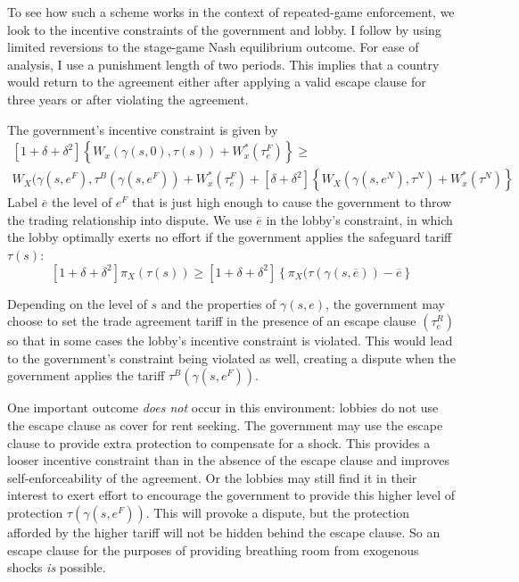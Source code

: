 \documentclass[12pt]{article}
\newcommand{\ov}{\overline}
\newcommand{\ga}{\gamma}
\newcommand{\de}{\delta}
\begin{document}
To see how such a scheme works in the context of repeated-game enforcement, we look to the incentive constraints of the government and lobby. I follow \Textcite{buzard2013a} by using limited reversions to the stage-game Nash equilibrium outcome. For ease of analysis, I use a punishment length of two periods. This implies that a country would return to the agreement either after applying a valid escape clause for three years or after violating the agreement.

The government's incentive constraint is given by
  \begin{multline}
    \left[1+ \de +\de^2 \right] \left\{W_x(\ga(s,0),\tau(s)) + W_x^*(\tau_e^F) \right\} \geq \\ W_X(\ga(s,e^F),\tau^B(\ga(s,e^F)) + W_x^*(\tau_e^F) + \left[\de +\de^2 \right] \left\{W_X(\ga(s,e^N),\tau^N) + W_x^*(\tau^N) \right\}
		\label{exp:govincentEC}
  \end{multline}
Label $\ov{e}$ the level of $e^F$ that is just high enough to cause the government to throw the trading relationship into dispute. We use $\ov{e}$ in the lobby's constraint, in which the lobby optimally exerts no effort if the government applies the safeguard tariff $\tau(s)$:
\begin{equation}
  \left[1+ \de +\de^2 \right] \pi_X(\tau(s)) \geq \left[1+ \de +\de^2 \right] \left\{\pi_X(\tau(\ga(s,\ov{e})) - \ov{e} \right\}
	\label{exp:lobbyEC}
\end{equation}

Depending on the level of $s$ and the properties of $\ga(s,e)$, the government may choose to set the trade agreement tariff in the presence of an escape clause $\left(\tau_e^R\right)$ so that in some cases the lobby's incentive constraint is violated. This would lead to the government's constraint being violated as well, creating a dispute when the government applies the tariff $\tau^B(\ga(s,e^F))$. 

One important outcome \textit{does not} occur in this environment: lobbies do not use the escape clause as cover for rent seeking. The government may use the escape clause to provide extra protection to compensate for a shock. This provides a looser incentive constraint than in the absence of the escape clause and improves self-enforceability of the agreement. Or the lobbies may still find it in their interest to exert effort to encourage the government to provide this higher level of protection $\tau(\ga(s,e^F))$. This will provoke a dispute, but the protection afforded by the higher tariff will not be hidden behind the escape clause. So an escape clause for the purposes of providing breathing room from exogenous shocks \textit{is} possible.
\end{document}
